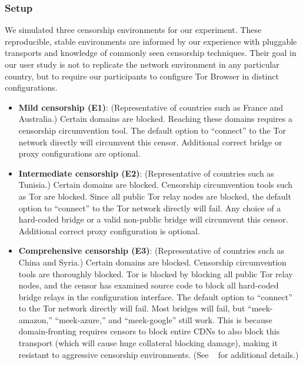 \documentclass[USenglish,oneside,twocolumn]{article}
\begin{document}
\subsubsection{Setup}
\label{sec:setup}
We simulated three censorship environments for our experiment.
These reproducible, stable environments are informed by our experience 
with pluggable transports and knowledge of commonly seen censorship 
techniques. Their goal in our user study is not to replicate the network 
environment in any particular country, but to require our participants to 
configure Tor Browser in distinct configurations. \\

\begin{itemize} \itemsep1pt \parskip0pt 
\item {\bfseries Mild censorship (E1)}: 
(Representative of countries such as France and Australia.)
Certain domains are blocked. Reaching these 
domains requires a censorship circumvention 
tool. The default option to ``connect'' to the Tor network 
directly will circumvent this censor. Additional correct
bridge or proxy configurations are optional. 

\item {\bfseries Intermediate censorship (E2)}: 
(Representative of countries such as Tunisia.)
Certain domains are blocked. Censorship circumvention
tools such as Tor are blocked. Since all public Tor
relay nodes are blocked, the default option to ``connect'' to the Tor network
directly will fail. Any choice of a hard-coded bridge
or a valid non-public bridge will circumvent this censor.  
Additional correct proxy configuration is optional.

\item {\bfseries Comprehensive censorship (E3)}:
(Representative of countries such as China and Syria.)
Certain domains are blocked. Censorship circumvention tools
are thoroughly blocked. Tor is blocked by blocking all public
Tor relay nodes, and the censor has examined source code to block
all hard-coded bridge relays in the configuration interface. The default option
to ``connect'' to the Tor network directly will fail. Most bridges will fail,
but ``meek-amazon,'' ``meek-azure,'' and ``meek-google'' still work.
This is because domain-fronting requires censors to block entire CDNs to also
block this transport (which will cause huge collateral blocking damage), making
it resistant to aggressive censorship environments.
(See ~\cite{fifield2015blocking} for additional details.)\\
\end{itemize}
\end{document}
